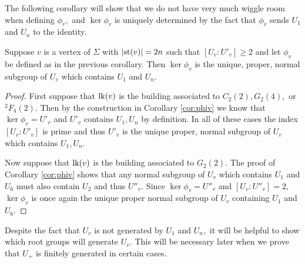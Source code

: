\documentclass[class=book, crop=false,12 pt]{standalone}
\begin{document}
The following corollary will show that we do not have very much wiggle room when defining $\phi_v,$ and $\ker \phi_v$ is uniquely determined by the fact that $\phi_v$ sends $U_1$ and $U_n$ to the identity.
\begin{cor}
	\label{cor:uniquephiv}
	Suppose $v$ is a vertex of $\Sigma$ with $|\mathrm{st}(v)|=2n$ such that $[U_v:U'_v]\ge 2$ and let $\phi_v$ be defined as in the previous corollary. Then $\ker \phi_v$ is the unique, proper, normal subgroup of $U_v$ which contains $U_1$ and $U_n.$
\end{cor}
\begin{proof}
	First suppose that $\mathrm{lk}(v)$ is the building associated to $C_2(2),G_2(4),$ or ${}^2F_4(2).$ Then by the construction in Corollary \ref{cor:phiv} we know that $\ker \phi_v=U'_v$ and $U'_v$ contains $U_1,U_n$ by definition. In all of these cases the index $[U_v:U'_v]$ is prime and thus $U'_v$ is the unique proper, normal subgroup of $U_v$ which contains $U_1,U_n.$

	Now suppose that $\mathrm{lk}(v)$ is the building associated to $G_2(2).$ The proof of Corollary \ref{cor:phiv} shows that any normal subgroup of $U_v$ which contains $U_1$ and $U_6$ must also contain $U_2$ and thus $U''_v.$ Since $\ker \phi_v=U''_v$ and $[U_v:U''_v]=2,$ $\ker\phi_v$ is once again the unique proper normal subgroup of $U_v$ containing $U_1$ and $U_6.$
\end{proof}

Despite the fact that $U_v$ is not generated by $U_1$ and $U_n,$ it will be helpful to show which root groups will generate $U_v.$ This will be necessary later when we prove that $U_+$ is finitely generated in certain cases.
\end{document}
